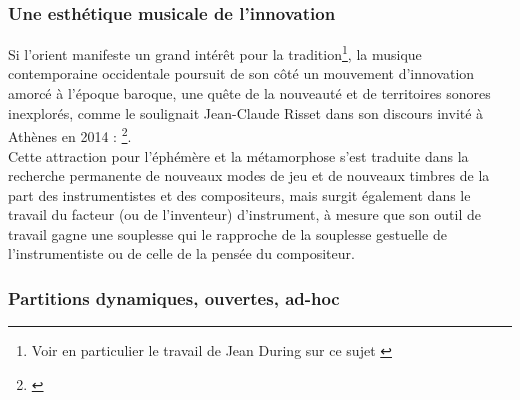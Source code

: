 \subsubsection{Une esthétique musicale de l'innovation}

\noindent Si l'orient manifeste un grand intérêt pour la tradition\footnote{Voir en particulier le travail de Jean During sur ce sujet \cite{during_quelque_1994}}, la musique contemporaine occidentale poursuit de son côté un mouvement d'innovation amorcé à l'époque baroque, une quête de la nouveauté et de territoires sonores inexplorés, comme le soulignait Jean-Claude Risset dans son discours invité à Athènes en 2014 : \footnote{ \cite{risset_sound_2014}}.\\
\indent Cette attraction pour l'éphémère et la métamorphose s'est traduite dans la recherche permanente de nouveaux modes de jeu et de nouveaux timbres de la part des instrumentistes et des compositeurs, mais surgit également dans le travail du facteur (ou de l'inventeur) d'instrument, à mesure que son outil de travail gagne une souplesse qui le rapproche de la souplesse gestuelle de l'instrumentiste ou de celle de la pensée du compositeur.


\subsubsection{Partitions dynamiques, ouvertes, ad-hoc}
\label{sec:ephemeral:longevity_stability:dynamic_scores}

